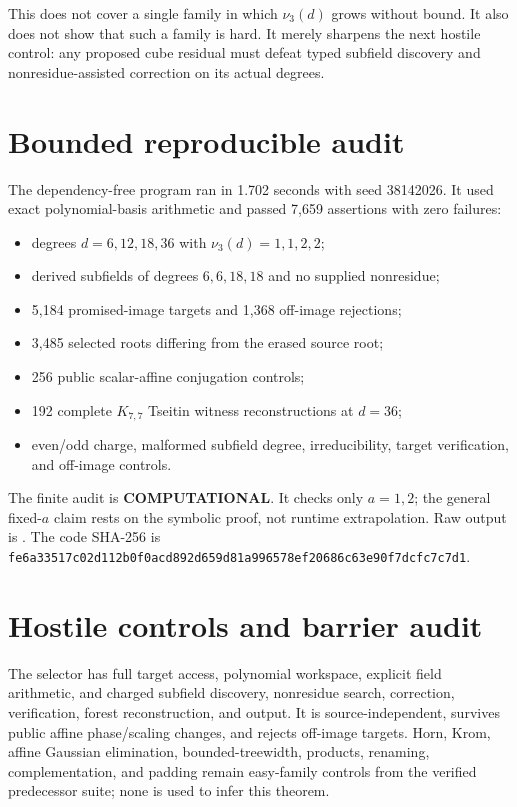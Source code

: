 \documentclass[11pt]{article}
\newcommand{\COMP}{\textbf{COMPUTATIONAL}}
\begin{document}
This does not cover a single family in which $\nu_3(d)$ grows without bound.
It also does not show that such a family is hard.  It merely sharpens the
next hostile control: any proposed cube residual must defeat typed subfield
discovery and nonresidue-assisted correction on its actual degrees.

\section{Bounded reproducible audit}
The dependency-free program
 ran in
1.702 seconds with seed 38142026.  It used exact polynomial-basis arithmetic
and passed 7,659 assertions with zero failures:
\begin{itemize}
\item degrees $d=6,12,18,36$ with $\nu_3(d)=1,1,2,2$;
\item derived subfields of degrees $6,6,18,18$ and no supplied nonresidue;
\item 5,184 promised-image targets and 1,368 off-image rejections;
\item 3,485 selected roots differing from the erased source root;
\item 256 public scalar-affine conjugation controls;
\item 192 complete $K_{7,7}$ Tseitin witness reconstructions at $d=36$;
\item even/odd charge, malformed subfield degree, irreducibility, target
verification, and off-image controls.
\end{itemize}
The finite audit is \COMP{}.  It checks only $a=1,2$; the general fixed-$a$
claim rests on the symbolic proof, not runtime extrapolation.  Raw output is
.
The code SHA-256 is
\texttt{fe6a33517c02d112b0f0acd892d659d81a996578ef20686c63e90f7dcfc7c7d1}.

\section{Hostile controls and barrier audit}
The selector has full target access, polynomial workspace, explicit field
arithmetic, and charged subfield discovery, nonresidue search, correction,
verification, forest reconstruction, and output.  It is source-independent,
survives public affine phase/scaling changes, and rejects off-image targets.
Horn, Krom, affine Gaussian elimination, bounded-treewidth, products,
renaming, complementation, and padding remain easy-family controls from the
verified predecessor suite; none is used to infer this theorem.
\end{document}
